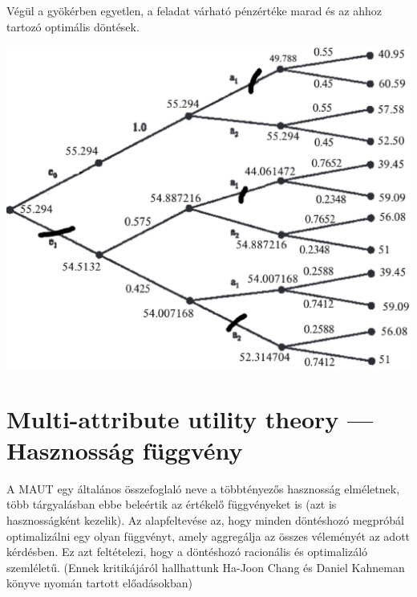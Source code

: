 \documentclass[a4paper,12pt]{article}
\begin{document}
Végül a gyökérben egyetlen, a feladat várható pénzértéke marad és az ahhoz tartozó optimális döntések.

\begin{center}

\includegraphics[scale=0.7]{dectree04}
\\
\end{center}

\section{Multi-attribute utility theory --- Hasznosság függvény}
\label{sec:utility}

A MAUT egy általános összefoglaló neve a többtényezős hasznosság elméletnek, több tárgyalásban ebbe beleértik az értékelő függvényeket is (azt is hasznosságként kezelik). Az alapfeltevése az, hogy minden döntéshozó megpróbál optimalizálni egy olyan függvényt, amely aggregálja az összes véleményét az adott kérdésben. Ez azt feltételezi, hogy a döntéshozó racionális és optimalizáló szemléletű. (Ennek kritikájáról hallhattunk Ha-Joon Chang és Daniel Kahneman könyve nyomán tartott előadásokban)
\end{document}

